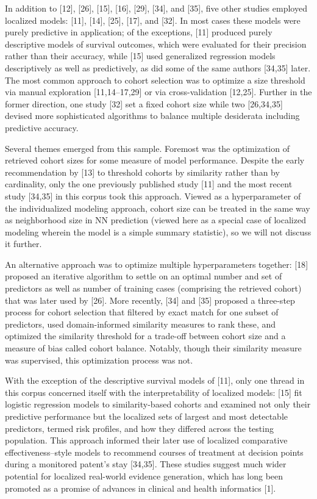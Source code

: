 \documentclass[preprint, 3p,
authoryear]{elsarticle} %
\begin{document}
In addition to {[}12{]}, {[}26{]}, {[}15{]}, {[}16{]}, {[}29{]},
{[}34{]}, and {[}35{]}, five other studies employed localized models:
{[}11{]}, {[}14{]}, {[}25{]}, {[}17{]}, and {[}32{]}. In most cases
these models were purely predictive in application; of the exceptions,
{[}11{]} produced purely descriptive models of survival outcomes, which
were evaluated for their precision rather than their accuracy, while
{[}15{]} used generalized regression models descriptively as well as
predictively, as did some of the same authors {[}34,35{]} later. The
most common approach to cohort selection was to optimize a size
threshold via manual exploration {[}11,14--17,29{]} or via
cross-validation {[}12,25{]}. Further in the former direction, one study
{[}32{]} set a fixed cohort size while two {[}26,34,35{]} devised more
sophisticated algorithms to balance multiple desiderata including
predictive accuracy.

Several themes emerged from this sample. Foremost was the optimization
of retrieved cohort sizes for some measure of model performance. Despite
the early recommendation by {[}13{]} to threshold cohorts by similarity
rather than by cardinality, only the one previously published study
{[}11{]} and the most recent study {[}34,35{]} in this corpus took this
approach. Viewed as a hyperparameter of the individualized modeling
approach, cohort size can be treated in the same way as neighborhood
size in NN prediction (viewed here as a special case of localized
modeling wherein the model is a simple summary statistic), so we will
not discuss it further.

An alternative approach was to optimize multiple hyperparameters
together: {[}18{]} proposed an iterative algorithm to settle on an
optimal number and set of predictors as well as number of training cases
(comprising the retrieved cohort) that was later used by {[}26{]}. More
recently, {[}34{]} and {[}35{]} proposed a three-step process for cohort
selection that filtered by exact match for one subset of predictors,
used domain-informed similarity measures to rank these, and optimized
the similarity threshold for a trade-off between cohort size and a
measure of bias called cohort balance. Notably, though their similarity
measure was supervised, this optimization process was not.

With the exception of the descriptive survival models of {[}11{]}, only
one thread in this corpus concerned itself with the interpretability of
localized models: {[}15{]} fit logistic regression models to
similarity-based cohorts and examined not only their predictive
performance but the localized sets of largest and most detectable
predictors, termed risk profiles, and how they differed across the
testing population. This approach informed their later use of localized
comparative effectiveness--style models to recommend courses of
treatment at decision points during a monitored patent's stay
{[}34,35{]}. These studies suggest much wider potential for localized
real-world evidence generation, which has long been promoted as a
promise of advances in clinical and health informatics {[}1{]}.
\end{document}
